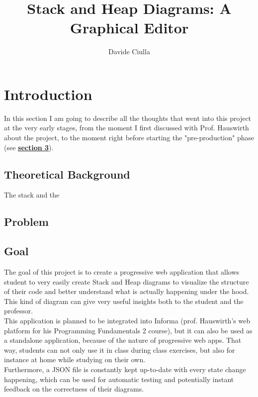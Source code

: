 \documentclass[]{usiinfbachelorproject}
\author{Davide Ciulla}
\title{Stack and Heap Diagrams: A Graphical Editor}
\begin{document}
\maketitle


\tableofcontents
\newpage


\section{Introduction} \label{introduction}

In this section I am going to describe all the thoughts that went into this project at the very early stages, from the moment I first discussed with Prof. Hauswirth about the project, to the moment right before starting the "pre-production" phase (see \hyperref[requirements+analysis]{\textbf{section 3}}).

\subsection{Theoretical Background}

The stack and the  

\subsection{Problem}



\subsection{Goal} \label{goal}

The goal of this project is to create a progressive web application that allows student to very easily create Stack and Heap diagrams to visualize the structure of their code and better understand what is actually happening under the hood. This kind of diagram can give very useful insights both to the student and the professor.\\ This application is planned to be integrated into Informa (prof. Hauswirth's web platform for his Programming Fundamentals 2 course), but it can also be used as a standalone application, because of the nature of progressive web apps. That way, students can not only use it in class during class exercises, but also for instance at home while studying on their own.\\
Furthermore, a JSON file is constantly kept up-to-date with every state change happening, which can be used for automatic testing and potentially instant feedback on the correctness of their diagrams.
\end{document}
